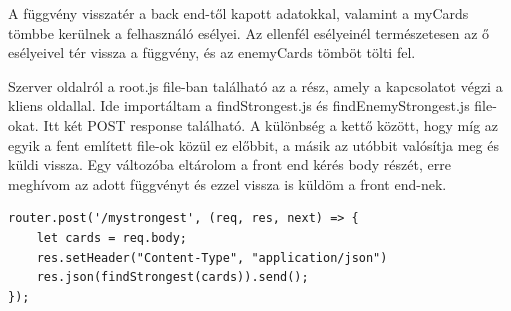 A függvény visszatér a back end-től kapott adatokkal, valamint a myCards tömbbe kerülnek a felhasználó esélyei. Az ellenfél esélyeinél természetesen az ő esélyeivel tér vissza a függvény, és az enemyCards tömböt tölti fel.

Szerver oldalról a root.js file-ban található az a rész, amely a kapcsolatot végzi a kliens oldallal. Ide importáltam a findStrongest.js és findEnemyStrongest.js file-okat. Itt két POST response található. A különbség a kettő között, hogy míg az egyik a fent említett file-ok közül ez előbbit, a másik az utóbbit valósítja meg és küldi vissza. Egy változóba eltárolom a front end kérés body részét, erre meghívom az adott függvényt és ezzel vissza is küldöm a front end-nek.

\begin{lstlisting}[style=htmlcssjs]
router.post('/mystrongest', (req, res, next) => {
    let cards = req.body;
    res.setHeader("Content-Type", "application/json")
    res.json(findStrongest(cards)).send();
});
\end{lstlisting}